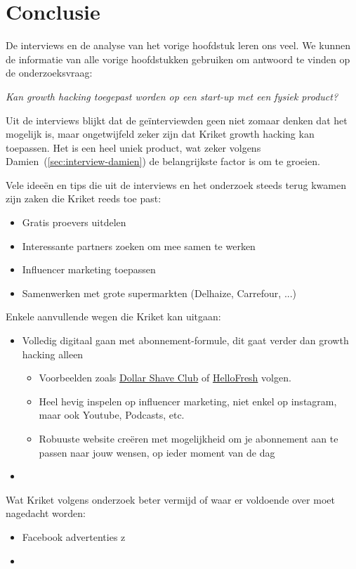 
\chapter{Conclusie}
\label{ch:conclusie}


De interviews en de analyse van het vorige hoofdstuk leren ons veel. We kunnen de informatie van alle vorige hoofdstukken gebruiken om antwoord te vinden op de onderzoeksvraag:

\emph{Kan growth hacking toegepast worden op een start-up met een fysiek product?}

Uit de interviews blijkt dat de geïnterviewden geen niet zomaar denken dat het mogelijk is, maar ongetwijfeld zeker zijn dat Kriket growth hacking kan toepassen. Het is een heel uniek product, wat zeker volgens Damien~(\ref{sec:interview-damien}) de belangrijkste factor is om te groeien. 

Vele ideeën en tips die uit de interviews en het onderzoek steeds terug kwamen zijn zaken die Kriket reeds toe past:
\begin{itemize}
	\item Gratis proevers uitdelen
	\item Interessante partners zoeken om mee samen te werken
	\item Influencer marketing toepassen
	\item Samenwerken met grote supermarkten (Delhaize, Carrefour, ...)
\end{itemize}

Enkele aanvullende wegen die Kriket kan uitgaan:
\begin{itemize}
	\item Volledig digitaal gaan met abonnement-formule, dit gaat verder dan growth hacking alleen
	\begin{itemize}
		\item Voorbeelden zoals \href{https://www.dollarshaveclub.com/}{Dollar Shave Club} of \href{https://www.hellofresh.be/}{HelloFresh} volgen.
		\item Heel hevig inspelen op influencer marketing, niet enkel op instagram, maar ook Youtube, Podcasts, etc.
		\item Robuuste website creëren met mogelijkheid om je abonnement aan te passen naar jouw wensen, op ieder moment van de dag
	\end{itemize}
	\item 
\end{itemize}

Wat Kriket volgens onderzoek beter vermijd of waar er voldoende over moet nagedacht worden:
\begin{itemize}
	\item Facebook advertenties z
	\item 
\end{itemize}

